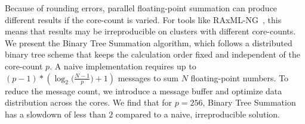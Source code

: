 
\Abstract
Because of rounding errors, parallel floating-point summation can produce different results if the core-count is varied.
For tools like RAxML-NG~\cite{kozlov_raxml-ng_2019-1}, this means that results may be irreproducible on clusters with different core-counts.
We present the Binary Tree Summation algorithm, which follows a distributed binary tree scheme that keeps the calculation order fixed and independent of the core-count $p$.
A naive implementation requires up to $(p - 1) * (\log_2 \big(\frac{N-1}{p} \big) + 1)$ messages to sum $N$ floating-point numbers.
To reduce the message count, we introduce a message buffer and optimize data distribution across the cores.
We find that for $p=256$, Binary Tree Summation has a slowdown of less than $2$ compared to a naive, irreproducible solution.